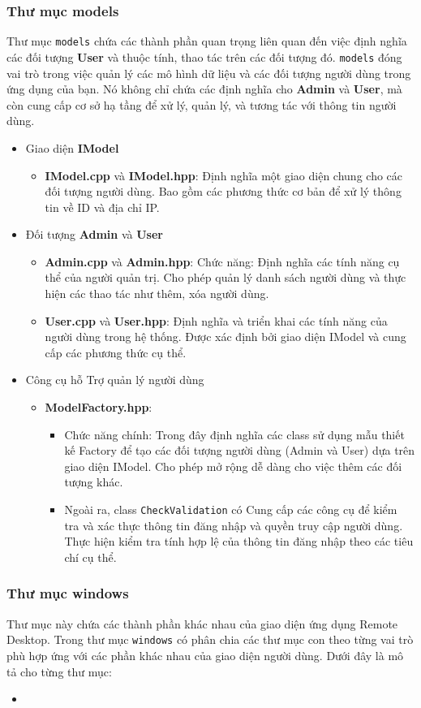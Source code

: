 \subsubsection{Thư mục models}
Thư mục \verb|models| chứa các thành phần quan trọng liên quan đến việc định nghĩa các đối tượng \textbf{User} và thuộc tính, thao tác trên các đối tượng đó. \verb|models| đóng vai trò trong việc quản lý các  mô hình dữ liệu và các đối tượng người dùng trong ứng dụng của bạn. Nó không chỉ chứa các định nghĩa cho \textbf{Admin} và \textbf{User}, mà còn cung cấp cơ sở hạ tầng để xử lý, quản lý, và tương tác với thông tin người dùng.
\begin{itemize}
	\item Giao diện \textbf{IModel}
	\begin{itemize}
		\item \textbf{IModel.cpp} và \textbf{IModel.hpp}: Định nghĩa một giao diện chung cho các đối tượng người dùng. Bao gồm các phương thức cơ bản để xử lý thông tin về ID và địa chỉ IP.
	\end{itemize}
	\item Đối tượng \textbf{Admin} và \textbf{User}
	\begin{itemize}
		\item \textbf{Admin.cpp} và \textbf{Admin.hpp}:  Chức năng: Định nghĩa các tính năng cụ thể của người quản trị. Cho phép quản lý danh sách người dùng và thực hiện các thao tác như thêm, xóa người dùng.
		\item \textbf{User.cpp} và \textbf{User.hpp}: Định nghĩa và triển khai các tính năng của người dùng trong hệ thống. Được xác định bởi giao diện IModel và cung cấp các phương thức cụ thể.
	\end{itemize}
	\item Công cụ hỗ Trợ quản lý người dùng
	\begin{itemize}
		\item \textbf{ModelFactory.hpp}: 
		\begin{itemize}
			\item Chức năng chính: Trong đây định nghĩa các class sử dụng mẫu thiết kế Factory để tạo các đối tượng người dùng (Admin và User) dựa trên giao diện IModel. Cho phép mở rộng dễ dàng cho việc thêm các đối tượng khác.
			\item Ngoài ra, class \verb|CheckValidation| có Cung cấp các công cụ để kiểm tra và xác thực thông tin đăng nhập và quyền truy cập người dùng. Thực hiện kiểm tra tính hợp lệ của thông tin đăng nhập theo các tiêu chí cụ thể. 
		\end{itemize} 
	\end{itemize}
\end{itemize}

\subsubsection{Thư mục windows}
Thư mục này chứa các thành phần khác nhau của giao diện ứng dụng Remote Desktop. Trong thư mục \verb|windows| có phân chia các thư mục con theo từng vai trò phù hợp ứng với các phần khác nhau của giao diện người dùng. Dưới đây là mô tả cho từng thư mục:
\begin{itemize}
	\item 
\end{itemize}	